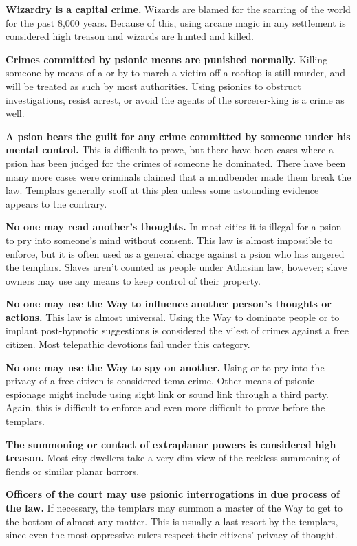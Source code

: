 \begin{itemize*}
\item \textbf{Wizardry is a capital crime.} Wizards are blamed for the scarring of the world for the past 8,000 years. Because of this, using arcane magic in any settlement is considered high treason and wizards are hunted and killed.

\item \textbf{Crimes committed by psionic means are punished normally.} Killing someone by means of a  or by  to march a victim off a rooftop is still murder, and will be treated as such by most authorities. Using psionics to obstruct investigations, resist arrest, or avoid the agents of the sorcerer-king is a crime as well.

\item \textbf{A psion bears the guilt for any crime committed by someone under his mental control.} This is difficult to prove, but there have been cases where a psion has been judged for the crimes of someone he dominated. There have been many more cases were criminals claimed that a mindbender made them break the law. Templars generally scoff at this plea unless some astounding evidence appears to the contrary.

\item \textbf{No one may read another's thoughts.} In most cities it is illegal for a psion to pry into someone's mind without consent. This law is almost impossible to enforce, but it is often used as a general charge against a psion who has angered the templars. Slaves aren't counted as people under Athasian law, however; slave owners may use any means to keep control of their property.

\item \textbf{No one may use the Way to influence another person's thoughts or actions.} This law is almost universal. Using the Way to dominate people or to implant post-hypnotic suggestions is considered the vilest of crimes against a free citizen. Most telepathic devotions fail under this category. %

\item \textbf{No one may use the Way to spy on another.} Using  or  to pry into the privacy of a free citizen is considered tema crime. Other means of psionic espionage might include using sight link or sound link through a third party. Again, this is difficult to enforce and even more difficult to prove before the templars.

\item \textbf{The summoning or contact of extraplanar powers is considered high treason.} Most city-dwellers take a very dim view of the reckless summoning of fiends or similar planar horrors.

\item \textbf{Officers of the court may use psionic interrogations in
due process of the law.} If necessary, the templars may summon a master of the Way to get to the bottom of almost any matter. This is usually a last resort by the templars, since even the most oppressive rulers respect their citizens' privacy of thought. 
\end{itemize*}
